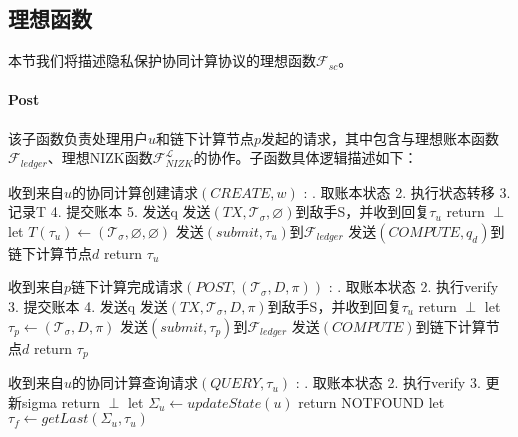 \subsection{理想函数}
本节我们将描述隐私保护协同计算协议的理想函数$\mathcal{F}_{sc}$。
\paragraph{Post} 该子函数负责处理用户$u$和链下计算节点$p$发起的请求，其中包含与理想账本函数$\mathcal{F}_{ledger}$、理想NIZK函数$\mathcal{F}_{NIZK}^\mathcal{L}$的协作。子函数具体逻辑描述如下：
\begin{breakablealgorithm}
    \caption{$\mathcal{F}_{Post}$}
    \label{alg:ch4-4}
    \begin{algorithmic} 
        \item[收到来自$u$的协同计算创建请求$(CREATE, w)$]:
        . 取账本状态 2. 执行状态转移 3. 记录T 4. 提交账本 5. 发送q
        \STATE 发送$(TX, \mathcal{T}_\sigma, \varnothing)$到敌手S，并收到回复$\tau_u$
        \STATE return $\perp$
        \ENDIF
        \STATE let $T(\tau_u) \leftarrow (\mathcal{T}_\sigma, \varnothing, \varnothing)$
        \STATE 发送$(submit, \tau_u)$到$\mathcal{F}_{ledger}$
        \STATE 发送$(COMPUTE, q_d)$到链下计算节点$d$
        \ENDFOR
        \STATE return $\tau_u$
        \item[收到来自$p$链下计算完成请求$(POST, (\mathcal{T}_\sigma, D, \pi))$]:
        . 取账本状态 2. 执行verify 3. 提交账本 4. 发送q
        \STATE 发送$(TX, \mathcal{T}_\sigma, D, \pi)$到敌手S，并收到回复$\tau_u$
        \STATE return $\perp$
        \ENDIF
        \STATE let $\tau_p \leftarrow (\mathcal{T}_\sigma, D, \pi)$
        \STATE 发送$(submit, \tau_p)$到$\mathcal{F}_{ledger}$
        \STATE 发送$(COMPUTE)$到链下计算节点$d$
        \ENDFOR
        \STATE return $\tau_p$
        \item[收到来自$u$的协同计算查询请求$(QUERY, \tau_u)$]:
        . 取账本状态 2. 执行verify 3. 更新sigma
        \STATE return $\perp$
        \ENDIF
        \STATE let $\Sigma_u \leftarrow updateState(u)$
        \STATE return NOTFOUND
        \ENDIF
        \STATE let $\tau_f \leftarrow getLast(\Sigma_u, \tau_u)$
        
    \end{algorithmic}
\end{breakablealgorithm}

